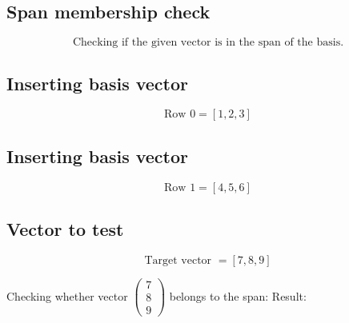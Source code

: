 \documentclass{article}
\begin{document}
\subsection*{ \vspace{1em} Span membership check}
\[
\text{Checking if the given vector is in the span of the basis.}
\]
\subsection*{ \vspace{1em} Inserting basis vector}
\[
\text{Row } 0 = \left[1, 2, 3\right]
\]
\subsection*{ \vspace{1em} Inserting basis vector}
\[
\text{Row } 1 = \left[4, 5, 6\right]
\]
\subsection*{ \vspace{1em} Vector to test}
\[
\text{Target vector } = \left[7, 8, 9\right]
\]
\medskip

Checking whether vector $\begin{pmatrix}7 \\ 8 \\ 9\end{pmatrix}$ belongs to the span:
Result: 
\bigskip

\hrulefill
\bigskip
\end{document}
